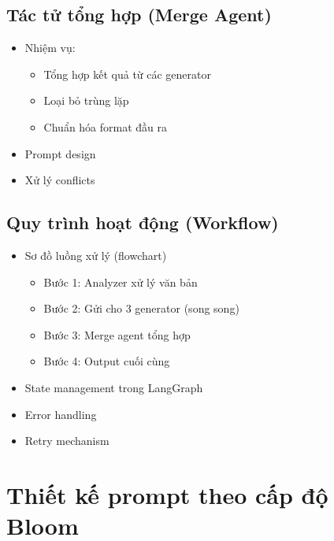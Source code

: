 \begin{itemize}
\subsection{Tác tử tổng hợp (Merge Agent)}
\begin{itemize}
    \item Nhiệm vụ:
    \begin{itemize}
        \item Tổng hợp kết quả từ các generator
        \item Loại bỏ trùng lặp
        \item Chuẩn hóa format đầu ra
    \end{itemize}
    \item Prompt design
    \item Xử lý conflicts
\end{itemize}

\subsection{Quy trình hoạt động (Workflow)}
\begin{itemize}
    \item Sơ đồ luồng xử lý (flowchart)
    \begin{itemize}
        \item Bước 1: Analyzer xử lý văn bản
        \item Bước 2: Gửi cho 3 generator (song song)
        \item Bước 3: Merge agent tổng hợp
        \item Bước 4: Output cuối cùng
    \end{itemize}
    \item State management trong LangGraph
    \item Error handling
    \item Retry mechanism
\end{itemize}
\end{itemize}

\section{Thiết kế prompt theo cấp độ Bloom}

